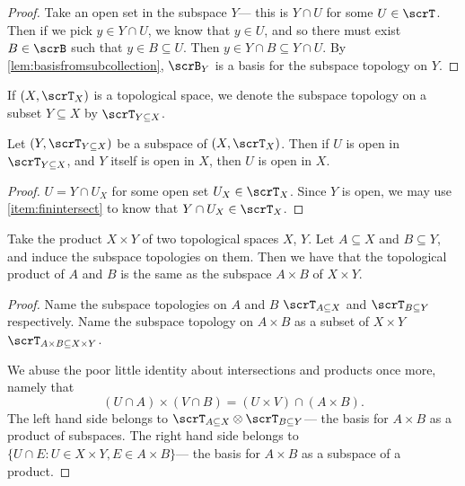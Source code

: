 \documentclass{article}
\begin{document}
\begin{proof}
    Take an open set in the subspace $Y$--- this is $Y \cap U$ for some $U \in \scrT$.
    Then if we pick $y \in Y \cap U$, we know that $y \in U$, and so there must exist $B \in \scrB$ such that $y \in B \subseteq U$.
    Then $y \in Y \cap B \subseteq Y \cap U$.
    By \ref{lem:basisfromsubcollection}, $\scrB_Y$ is a basis for the subspace topology on $Y$.
\end{proof}

\begin{convention}
    If $(X, \scrT_X)$ is a topological space, we denote the subspace topology on a subset $Y \subseteq X$ by $\scrT_{Y \subseteq X}$.
\end{convention}

\begin{lemma}
    Let $(Y, \scrT_{Y \subseteq X})$ be a subspace of $(X, \scrT_X)$.
    Then if $U$ is open in $\scrT_{Y \subseteq X}$, and $Y$ itself is open in $X$, then $U$ is open in $X$.
\end{lemma}

\begin{proof}
    $U = Y \cap U_X$ for some open set $U_X \in \scrT_X$.
    Since $Y$ is open, we may use \ref{item:finintersect} to know that $Y \cap U_X \in \scrT_X$.
\end{proof}

\begin{theorem}
    Take the product $X \times Y$ of two topological spaces $X$, $Y$.
    Let $A \subseteq X$ and $B \subseteq Y$, and induce the subspace topologies on them.
    Then we have that the topological product of $A$ and $B$ is the same as the subspace $A \times B$ of $X \times Y$.
\end{theorem}

\begin{proof}
    Name the subspace topologies on $A$ and $B$ $\scrT_{A \subseteq X}$ and $\scrT_{B \subseteq Y}$ respectively.
    Name the subspace topology on $A \times B$ as a subset of $X \times Y$ $\scrT_{A \times B \subseteq X \times Y}$.

    We abuse the poor little identity about intersections and products once more, namely that
    \[
        (U \cap A) \times (V \cap B) = (U \times V) \cap (A \times B).
    \]
    The left hand side belongs to $\scrT_{A \subseteq X} \otimes \scrT_{B \subseteq Y}$--- the basis for $A \times B$ as a product of subspaces.
    The right hand side belongs to $\{U \cap E: U \in X \times Y, E \in A \times B\}$--- the basis for $A \times B$ as a subspace of a product. 
\end{proof}
\end{document}
